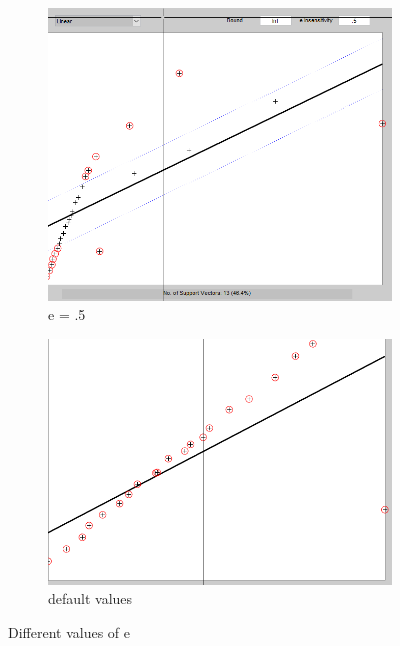 \documentclass[11pt,oneside,a4paper]{article}
\begin{document}
\begin{figure}[H]
	\begin{subfigure}[b]{0.4\textwidth}
		\includegraphics[width=\textwidth]{../Figures/linear_5}
		\caption{e = .5}
	\end{subfigure}
	\begin{subfigure}[b]{0.4\textwidth}
		\includegraphics[width=\textwidth]{../Figures/linear_urigress}
		\caption{default values}
	\end{subfigure}
	\caption{Different values of e}
	
\end{figure}
\end{document}
